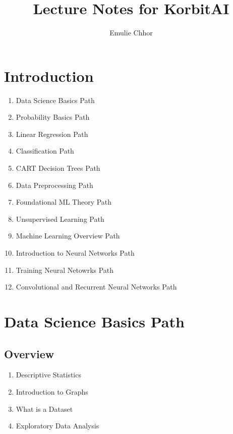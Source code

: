 \documentclass{article}
\begin{document}
\title{Lecture Notes for KorbitAI}
\author{Emulie Chhor}
\maketitle

\section*{Introduction}

\newtheorem{definition}{Definition}[subsection]
\newtheorem{theorem}{Theorem}[subsection]
\newtheorem{corollary}{Corollary}[subsection]
\newtheorem{lemma}[theorem]{Lemma}
\newtheorem{proposition}{Proposition}[section]
\newtheorem{axiom}{Axiome}
\newtheorem{property}{Propriété}[subsection]
\newtheorem*{remark}{Remarque}
\newtheorem*{problem}{Problème}
\newtheorem*{intuition}{Intuition}

\begin{enumerate}
    \item Data Science Basics Path
    \item Probability Basics Path
    \item Linear Regression Path
    \item Classification Path
    \item CART Decision Trees Path
    \item Data Preprocessing Path
    \item Foundational ML Theory Path
    \item Unsupervised Learning Path
    \item Machine Learning Overview Path
    \item Introduction to Neural Networks Path
    \item Training Neural Netowrks Path
    \item Convolutional and Recurrent Neural Networks Path
\end{enumerate}


\section{Data Science Basics Path}
\subsection{Overview}%
\label{sub:Overview}

\begin{enumerate}
    \item Descriptive Statistics
    \item Introduction to Graphs
    \item What is a Dataset
    \item Exploratory Data Analysis
\end{enumerate}
\end{document}
